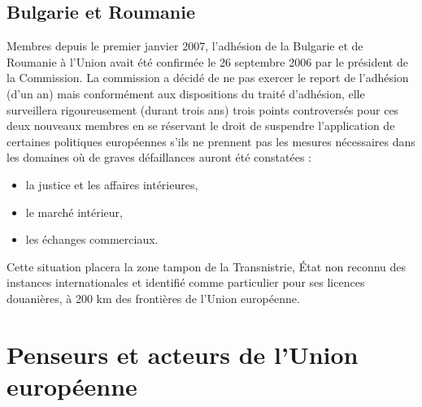 \documentclass{report}%
\begin{document}
\section{Bulgarie et Roumanie}
Membres depuis le premier janvier 2007, l'adhésion de la Bulgarie et de Roumanie à l'Union avait été confirmée le 26 septembre 2006 par le président de la Commission. La commission a décidé de ne pas exercer le report de l'adhésion (d'un an) mais conformément aux dispositions du traité d'adhésion, elle surveillera rigoureusement (durant trois ans) trois points controversés pour ces deux nouveaux membres en se réservant le droit de suspendre l'application de certaines politiques européennes s'ils ne prennent pas les mesures nécessaires dans les domaines où de graves défaillances auront été constatées :
	\begin{itemize}
		\item la justice et les affaires intérieures,
		\item le marché intérieur,
		\item les échanges commerciaux.
	\end{itemize}
Cette situation placera la zone tampon de la Transnistrie, État non reconnu des instances internationales et identifié comme particulier pour ses licences douanières, à 200 km des frontières de l'Union européenne.
\chapter{Penseurs et acteurs de l'Union européenne}
\end{document}
